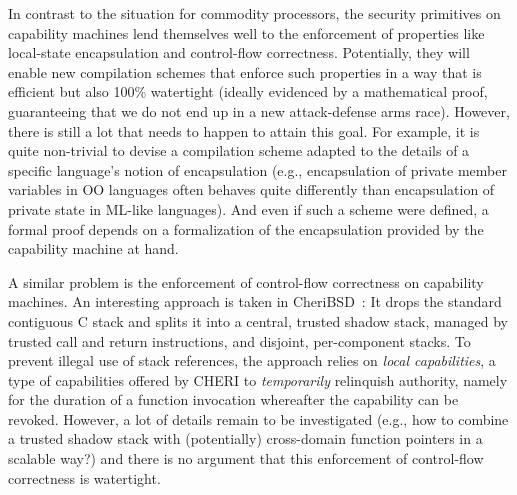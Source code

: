 \documentclass[compsoc,conference,letterpaper,fleqn]{IEEEtran}
\begin{document}
In contrast to the situation for commodity processors, the security
primitives on capability machines lend themselves well to the
enforcement of properties like local-state encapsulation and
control-flow correctness. Potentially, they will enable new compilation
schemes that enforce such properties in a way that is efficient but
also 100\% watertight (ideally evidenced by a mathematical proof,
guaranteeing that we do not end up in a new attack-defense arms
race). However, there is still a lot that needs to happen to attain
this goal. For example, it is quite non-trivial to devise a
compilation scheme adapted to the details of a specific language's
notion of encapsulation (e.g., encapsulation of private member
variables in OO languages often behaves quite differently than
encapsulation of private state in ML-like languages). And even if such
a scheme were defined, a formal proof depends on a formalization of
the encapsulation provided by the capability machine at hand.

A similar problem is the enforcement of control-flow correctness on capability
machines. An interesting approach is taken in CheriBSD~\citep{Watson2015Cheri}:
It drops the standard contiguous C stack and splits it into a central, trusted
shadow stack, managed by trusted call and return instructions, and disjoint,
per-component stacks. To prevent illegal use of stack references, the approach
relies on \emph{local capabilities}, a type of capabilities offered by CHERI
to \emph{temporarily} relinquish authority, namely for the duration of a function invocation whereafter the capability can be revoked.
However, a lot of details
remain to be investigated (e.g., how to combine a trusted shadow stack with
(potentially) cross-domain function pointers in a scalable way?) and there is no
argument that this enforcement of control-flow correctness is watertight.
\end{document}
